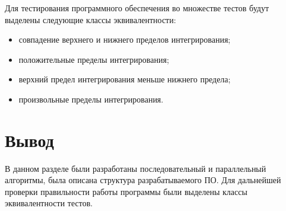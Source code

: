 Для тестирования программного обеспечения во множестве тестов будут выделены
следующие классы эквивалентности:
\begin{itemize}[left=\parindent]
    \item совпадение верхнего и нижнего пределов интегрирования; 
    \item положительные пределы интегрирования;
    \item верхний предел интегрирования меньше нижнего предела;
    \item произвольные пределы интегрирования.
\end{itemize}

\section{Вывод}

В данном разделе были разработаны последовательный и параллельный алгоритмы,
была описана структура разрабатываемого ПО.  Для дальнейшей проверки
правильности работы программы были выделены классы эквивалентности тестов.
